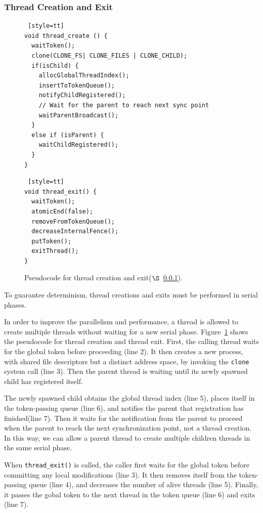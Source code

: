 \subsubsection{Thread Creation and Exit}

\label{sec:threadcreation}

\begin{figure}
\begin{lstlisting} [style=tt]
void thread_create () {
  waitToken();
  clone(CLONE_FS| CLONE_FILES | CLONE_CHILD);
  if(isChild) {
    allocGlobalThreadIndex();
    insertToTokenQueue();
    notifyChildRegistered();
	// Wait for the parent to reach next sync point
    waitParentBroadcast();	
  }
  else if (isParent) {
    waitChildRegistered();
  }
}
\end{lstlisting}
\begin{lstlisting} [style=tt]
void thread_exit() {
  waitToken();
  atomicEnd(false);
  removeFromTokenQueue();
  decreaseInternalFence();
  putToken();
  exitThread(); 
}
\end{lstlisting}
\caption{Pseudocode for thread creation and exit($\S$~\ref{sec:threadcreation}).
\label{fig:threadcreation}
}
\end{figure}

To guarantee determinism, thread creations and exits must be performed in serial phases. 

In order to improve the parallelism and performance, a thread is allowed to create multiple threads without waiting for a new serial phase. Figure~\ref{fig:threadcreation} shows the pseudocode for thread creation and thread exit. First, the calling thread waits for the global token before proceeding (line 2). It then creates a new process, with shared file descriptors but a distinct address space, by invoking the \texttt{clone} system call (line 3).  Then the parent thread is waiting until its newly spawned child has registered itself. 

The newly spawned child obtains the global thread index (line 5), places itself in the token-passing queue (line 6), and notifies the parent that registration has finished(line 7). Then it waits for the notification from the parent to proceed when the parent to reach the next synchronization point, not a thread creation.  In this way, we can allow a parent thread to create multiple children threads in the same serial phase. 

When \texttt{thread\_exit()} is called, the caller first waits for the global token before committing any local modifications (line 3). It then removes itself from the token-passing queue (line 4), and decreases the number of alive threads (line 5). Finally, it passes the gobal token to the next thread in the token queue (line 6) and exits (line 7).

